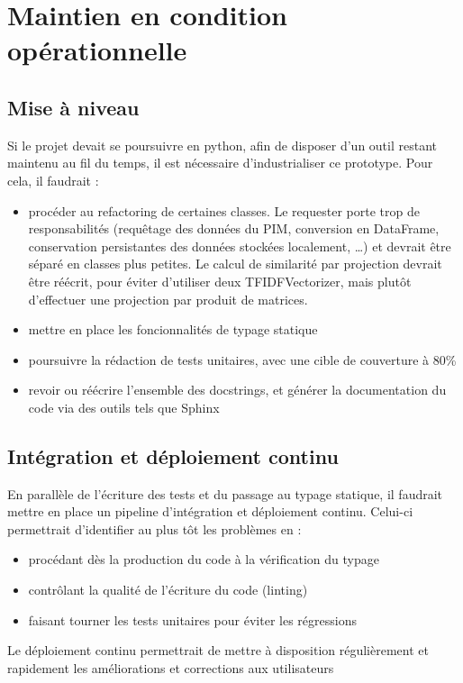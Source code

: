         \section{Maintien en condition opérationnelle}

            \subsection{Mise à niveau}
            
            Si le projet devait se poursuivre en python, afin de disposer d'un outil restant maintenu au fil du temps, il est nécessaire d'industrialiser ce prototype.
            Pour cela, il faudrait : 
            \begin{itemize}
                \item procéder au refactoring de certaines classes. Le requester porte trop de responsabilités (requêtage des données du PIM, conversion en DataFrame, conservation persistantes des données stockées localement, \dots) et devrait être séparé en classes plus petites. Le calcul de similarité par projection devrait être réécrit, pour éviter d'utiliser deux TFIDFVectorizer, mais plutôt d'effectuer une projection par produit de matrices.
                \item mettre en place les foncionnalités de typage statique
                \item poursuivre la rédaction de tests unitaires, avec une cible de couverture à 80\%
                \item revoir ou réécrire l'ensemble des docstrings, et générer la documentation du code via des outils tels que Sphinx
            \end{itemize}

            \subsection{Intégration et déploiement continu}

            En parallèle de l'écriture des tests et du passage au typage statique, il faudrait mettre en place un pipeline d'intégration et déploiement continu.
            Celui-ci permettrait d'identifier au plus tôt les problèmes en :
            \begin{itemize}
                \item procédant dès la production du code à la vérification du typage
                \item contrôlant la qualité de l'écriture du code (linting)
                \item faisant tourner les tests unitaires pour éviter les régressions
            \end{itemize}
            Le déploiement continu permettrait de mettre à disposition régulièrement et rapidement les améliorations et corrections aux utilisateurs

